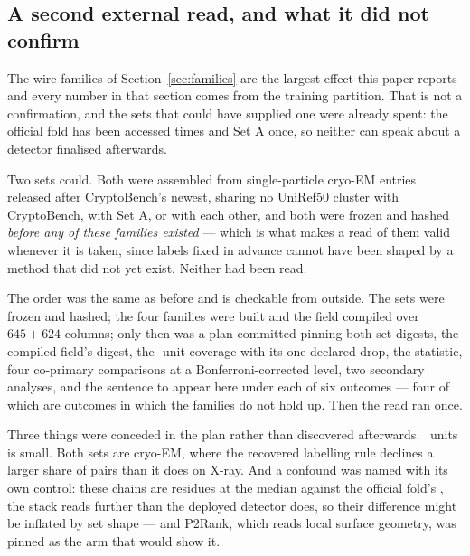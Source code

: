 \documentclass[11pt]{article}
\begin{document}
\subsection{A second external read, and what it did not confirm}
\label{sec:setbc}
The wire families of Section~\ref{sec:families} are the largest effect this paper
reports and every number in that section comes from the training partition. That
is not a confirmation, and the sets that could have supplied one were already
spent: the official fold has been accessed \NFoldAccesses{} times and Set A
once, so neither can speak about a detector finalised afterwards.

Two sets could. Both were assembled from single-particle cryo-EM entries released
after CryptoBench's newest, sharing no UniRef50 cluster with CryptoBench, with Set
A, or with each other, and both were frozen and hashed \emph{before any of these
families existed} --- which is what makes a read of them valid whenever it is
taken, since labels fixed in advance cannot have been shaped by a method that did
not yet exist. Neither had been read.

The order was the same as before and is checkable from outside. The sets were
frozen and hashed; the four families were built and the field compiled over
\(645+624\) columns; only then was a plan committed pinning both set digests, the
compiled field's digest, the \BcN{}-unit coverage with its one declared drop, the
statistic, four co-primary comparisons at a Bonferroni-corrected level, two
secondary analyses, and the sentence to appear here under each of six outcomes ---
four of which are outcomes in which the families do not hold up. Then the read
ran once.

Three things were conceded in the plan rather than discovered afterwards.
\BcN{}~units is small. Both sets are cryo-EM, where the recovered labelling rule
declines a larger share of pairs than it does on X-ray. And a confound was named
with its own control: these chains are \BcChain{} residues at the median against
the official fold's \ExtDiffLenOff{}, the stack reads further than the deployed
detector does, so their difference might be inflated by set shape --- and P2Rank,
which reads local surface geometry, was pinned as the arm that would show it.
\end{document}
